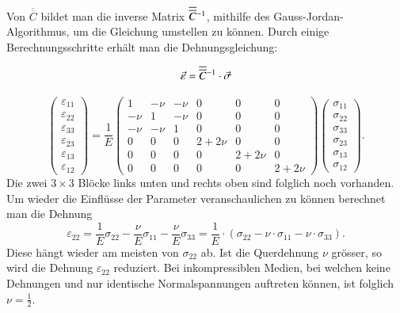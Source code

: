 Von  $\overline{\overline{C}}$ bildet man die inverse Matrix $\overline{\overline{C}}\mathstrut^{-1}$, mithilfe des Gauss-Jordan-Algorithmus, um die Gleichung umstellen zu können.
%
Durch einige Berechnungsschritte erhält man die Dehnungsgleichung:

\[
\vec{\varepsilon}
=
\overline{\overline{C}}\mathstrut^{-1}\cdot \vec{\sigma}
\]

\[
\begin{pmatrix}
	\varepsilon_{11}\\
	\varepsilon_{22}\\
	\varepsilon_{33}\\
	\varepsilon_{23}\\
	\varepsilon_{13}\\
	\varepsilon_{12}
\end{pmatrix}
=
\frac{1}{E}
\begin{pmatrix}
	   1 & -\nu & -\nu & 0      & 0      & 0     \\
	-\nu &    1 & -\nu & 0      & 0      & 0     \\
	-\nu & -\nu &    1 & 0      & 0      & 0     \\
 	   0 &    0 &    0 & 2+2\nu & 0      & 0     \\
	   0 &    0 &    0 &      0 & 2+2\nu & 0     \\
	   0 &    0 &    0 &      0 & 0      & 2+2\nu
\end{pmatrix}
\begin{pmatrix}
	\sigma_{11}\\
	\sigma_{22}\\
	\sigma_{33}\\
	\sigma_{23}\\
	\sigma_{13}\\
	\sigma_{12}
\end{pmatrix}
.
\]
Die zwei $3\times3$ Blöcke links unten und rechts oben sind folglich noch vorhanden.
Um wieder die Einflüsse der Parameter veranschaulichen zu können berechnet man die Dehnung
\[
\varepsilon_{22}
=
\frac{1}{E}\sigma_{22} - \frac{\nu}{E}\sigma_{11} - \frac{\nu}{E}\sigma_{33}
=
\frac{1}{E}\cdot(\sigma_{22}-\nu\cdot\sigma_{11}-\nu\cdot\sigma_{33})
.
\]
Diese hängt wieder am meisten von $\sigma_{22}$ ab.
Ist die Querdehnung $\nu$ grösser, so wird die Dehnung $\varepsilon_{22}$ reduziert.
Bei inkompressiblen Medien, bei welchen keine Dehnungen und nur identische Normalspannungen auftreten können, ist folglich $\nu=\frac12$.

